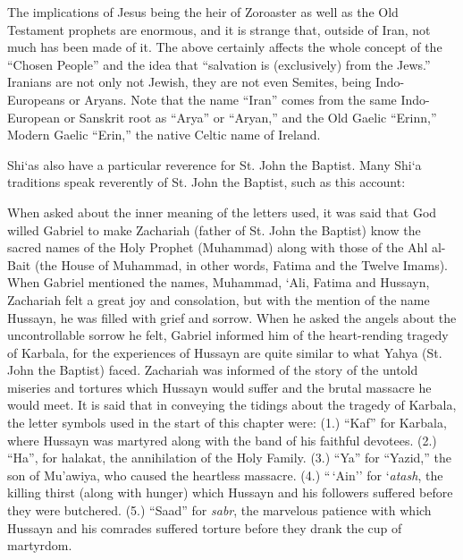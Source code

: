 The implications of Jesus being the heir of Zoroaster as well as the Old Testament prophets are enormous, and it is strange that, outside of Iran, not much has been made of it. The above certainly affects the whole concept of the ``Chosen People'' and the idea that ``salvation is (exclusively) from the Jews.'' Iranians are not only not Jewish, they are not even Semites, being Indo-Europeans or Aryans. Note that the name ``Iran'' comes from the same Indo-European or Sanskrit root as ``Arya'' or ``Aryan,'' and the Old Gaelic ``Erinn,'' Modern Gaelic ``Erin,'' the native Celtic name of Ireland.

Shi`as also have a particular reverence for St. John the Baptist. Many Shi`a traditions speak reverently of St. John the Baptist, such as this account:

\begin{quotationx}
When asked about the inner meaning of the letters used, it was said that God willed Gabriel to make Zachariah (father of St. John the Baptist) know the sacred names of the Holy Prophet (Muhammad) along with those of the Ahl al-Bait (the House of Muhammad, in other words, Fatima and the Twelve Imams). When Gabriel mentioned the names, Muhammad, `Ali, Fatima and Hussayn, Zachariah felt a great joy and consolation, but with the mention of the name Hussayn, he was filled with grief and sorrow. When he asked the angels about the uncontrollable sorrow he felt, Gabriel informed him of the heart-rending tragedy of Karbala, for the experiences of Hussayn are quite similar to what Yahya (St. John the Baptist) faced. Zachariah was informed of the story of the untold miseries and tortures which Hussayn would suffer and the brutal massacre he would meet. It is said that in conveying the tidings about the tragedy of Karbala, the letter symbols used in the start of this chapter were: (1.) ``Kaf'' for Karbala, where Hussayn was martyred along with the band of his faithful devotees. (2.) ``Ha'', for halakat, the annihilation of the Holy Family. (3.) ``Ya'' for ``Yazid,'' the son of Mu'awiya, who caused the heartless massacre. (4.) ``\,`Ain'' for `\emph{atash}, the killing thirst (along with hunger) which Hussayn and his followers suffered before they were butchered. (5.) ``Saad'' for \emph{sabr}, the marvelous patience with which Hussayn and his comrades suffered torture before they drank the cup of martyrdom.


\end{quotationx}
